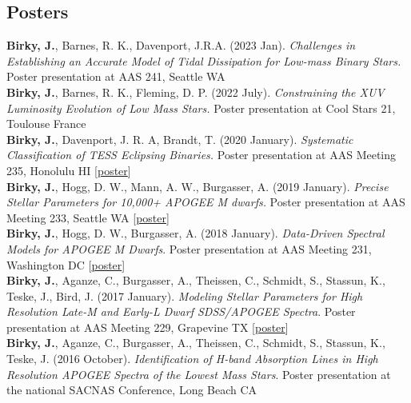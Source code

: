 \documentclass[margin,line]{resume}
\begin{document}
\begin{resume}

\section{\mysidestyle \textcolor{bcolor}{Posters}}
\textbf{Birky, J.}, Barnes, R. K., Davenport, J.R.A. (2023 Jan). \textsl{Challenges in Establishing an Accurate Model of Tidal Dissipation for Low-mass Binary Stars.} Poster presentation at AAS 241, Seattle WA \\
\newline
\textbf{Birky, J.}, Barnes, R. K., Fleming, D. P. (2022 July). \textsl{Constraining the XUV Luminosity Evolution of Low Mass Stars.} Poster presentation at Cool Stars 21, Toulouse France \\
\newline
\textbf{Birky, J.}, Davenport, J. R. A, Brandt, T. (2020 January). \textsl{Systematic Classification of TESS Eclipsing Binaries.} Poster presentation at AAS Meeting 235, Honolulu HI [\href{https://doi.org/10.5281/zenodo.3605647}{poster}] \\
\newline
\textbf{Birky, J.}, Hogg, D. W., Mann, A. W., Burgasser, A. (2019 January). \textsl{Precise Stellar Parameters for 10,000+ APOGEE M dwarfs.} Poster presentation at AAS Meeting 233, Seattle WA [\href{https://doi.org/10.5281/zenodo.2536586}{poster}] \\
\newline
\textbf{Birky, J.}, Hogg, D. W., Burgasser, A. (2018 January). \textit{Data-Driven Spectral Models for APOGEE M Dwarfs}. Poster presentation at AAS Meeting 231, Washington DC [\href{http://doi.org/10.5281/zenodo.1146909}{poster}] \\
\newline
\textbf{Birky, J.}, Aganze, C., Burgasser, A., Theissen, C., Schmidt, S., Stassun, K.,  Teske, J., Bird, J. (2017 January). \textsl{Modeling Stellar Parameters for High Resolution Late-M and Early-L Dwarf SDSS/APOGEE Spectra}. Poster presentation at AAS Meeting 229, Grapevine TX [\href{http://doi.org/10.5281/zenodo.1116625}{poster}]  \\
\newline
\textbf{Birky, J.}, Aganze, C., Burgasser, A., Theissen, C., Schmidt, S., Stassun, K.,  Teske, J. (2016 October). \textsl{Identification of H-band Absorption Lines in High Resolution APOGEE Spectra of the Lowest Mass Stars}. Poster presentation at the national SACNAS Conference, Long Beach CA 




\end{resume}
\end{document}
